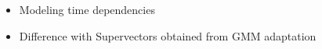 \begin{itemize}
	\item Modeling time dependencies
	\item Difference with Supervectors obtained from GMM adaptation
\end{itemize}